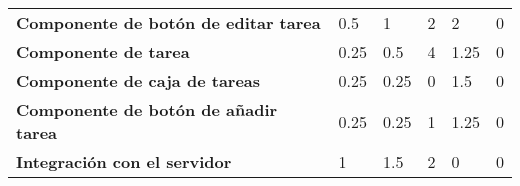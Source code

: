 \begin{table}[]
\begin{adjustbox}{width=\columnwidth,center}
\begin{tabular}{llllll}
{\color[HTML]{000000} \textbf{Componente de botón de editar tarea}}    & {\color[HTML]{000000} 0.5}                      & {\color[HTML]{000000} 1}                        & {\color[HTML]{000000} 2}                            & {\color[HTML]{000000} 2}                                    & {\color[HTML]{000000} 0}                                        \\
{\color[HTML]{000000} \textbf{Componente de tarea}}                    & {\color[HTML]{000000} 0.25}                     & {\color[HTML]{000000} 0.5}                      & {\color[HTML]{000000} 4}                            & {\color[HTML]{000000} 1.25}                                 & {\color[HTML]{000000} 0}                                        \\
{\color[HTML]{000000} \textbf{Componente de caja de tareas}}           & {\color[HTML]{000000} 0.25}                     & {\color[HTML]{000000} 0.25}                     & {\color[HTML]{000000} 0}                            & {\color[HTML]{000000} 1.5}                                  & {\color[HTML]{000000} 0}                                        \\
{\color[HTML]{000000} \textbf{Componente de botón de añadir tarea}}    & {\color[HTML]{000000} 0.25}                     & {\color[HTML]{000000} 0.25}                     & {\color[HTML]{000000} 1}                            & {\color[HTML]{000000} 1.25}                                 & {\color[HTML]{000000} 0}                                        \\
{\color[HTML]{000000} \textbf{Integración con el servidor}}            & {\color[HTML]{000000} 1}                        & {\color[HTML]{000000} 1.5}                      & {\color[HTML]{000000} 2}                            & {\color[HTML]{000000} 0}                                    & {\color[HTML]{000000} 0}
\end{tabular}
\end{adjustbox}
\end{table}

